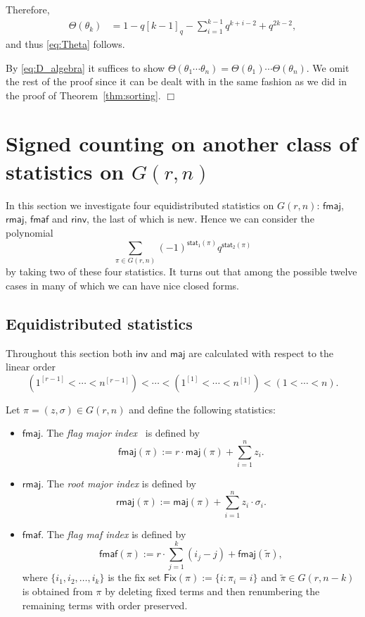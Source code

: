 \documentclass[a4paper, reqno, 11pt]{amsart}
\newcommand{\stat}{{\textsf{stat}}}
\newcommand{\maj}{{\textsf{maj}}}
\newcommand{\inv}{{\textsf{inv}}}
\newcommand{\fmaj}{{\textsf{fmaj}}}
\newcommand{\rmaj}{{\textsf{rmaj}}}
\newcommand{\fmaf}{{\textsf{fmaf}}}
\newcommand{\Fix}{{\textsf{Fix}}}
\newcommand{\rinv}{{\textsf{rinv}}}
\numberwithin{equation}{section}
\def\qed{\hspace*{\fill} $\Box$ \medskip}
\begin{document}
Therefore, 
\begin{align*}
\Theta(\theta_k) & = 1 - q[k-1]_q - \sum_{i=1}^{k-1}q^{k+i-2} + q^{2k-2}, 

\end{align*}
and thus \eqref{eq:Theta} follows.

By \eqref{eq:D_algebra} it suffices to show $\Theta(\theta_1\cdots\theta_n)=\Theta(\theta_1)\cdots\Theta(\theta_n)$.
We omit the rest of the proof since it can be dealt with in the same fashion as we did in the proof of Theorem~\ref{thm:sorting}.
\qed








\section{Signed counting on another class of statistics on $G(r,n)$}\label{sec:others}

In this section we investigate four equidistributed statistics on $G(r,n)$: $\fmaj$, $\rmaj$, $\fmaf$ and $\rinv$, the last of which is new. 
Hence we can consider the polynomial
$$\sum_{\pi\in G(r,n)}(-1)^{\stat_1(\pi)}q^{\stat_2(\pi)}$$
by taking two of these four statistics.
It turns out that among the possible twelve cases in many of which we can have nice closed forms.


\subsection{Equidistributed statistics}\label{sec:others_intro}
Throughout this section both $\inv$ and $\maj$ are calculated with respect to the linear order
$$(1^{[r-1]}<\cdots<n^{[r-1]})<\cdots<(1^{[1]}<\cdots<n^{[1]})<(1<\cdots<n).$$

Let $\pi=(z, \sigma)\in G(r,n)$ and define the following statistics:
\begin{itemize}
\item $\fmaj$. The \emph{flag major index}~\cite{Adin_Roichman_01} is defined by
	$$\fmaj(\pi):=r\cdot\maj(\pi)+\sum_{i=1}^n z_i.$$
\item $\rmaj$. The \emph{root major index}\cite{Haglund_Loehr_Remmel_05} is defined by
	$$\rmaj(\pi):=\maj(\pi)+\sum_{i=1}^n z_i\cdot \sigma_i.$$
\item $\fmaf$. The \emph{flag maf index}\cite{Faliharimalala_Zeng_11} is defined by
	$$\fmaf(\pi):=r\cdot \sum_{j=1}^k(i_j-j)+\fmaj(\tilde{\pi}),$$
	where $\{i_1,i_2,\ldots,i_k\}$ is the fix set $\Fix(\pi):=\{i:\pi_i=i\}$ and $\tilde{\pi}\in G(r,n-k)$ is obtained from $\pi$ by deleting fixed terms and then renumbering the remaining terms with order preserved.
\end{itemize}
\end{document}

